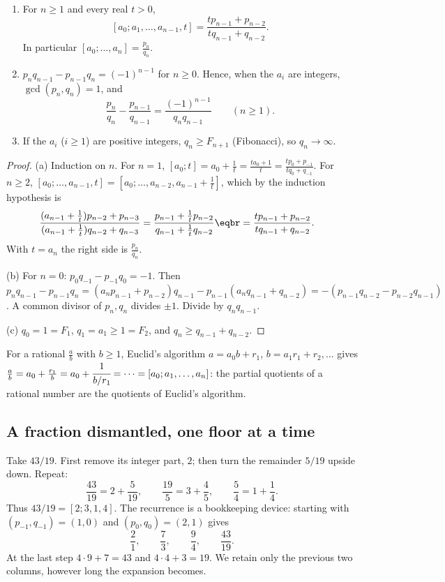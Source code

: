 \begin{proposition}\label{prop:cfconv}
\begin{enumerate}[label=(\alph*)]
\item For $n\ge1$ and every real $t>0$,
\[
[a_0;a_1,\dots,a_{n-1},t]=\frac{tp_{n-1}+p_{n-2}}{tq_{n-1}+q_{n-2}}.
\]
In particular $[a_0;\dots,a_n]=\frac{p_n}{q_n}$.
\item $p_nq_{n-1}-p_{n-1}q_n=(-1)^{n-1}$ for $n\ge0$. Hence, when the $a_i$ are integers, $\gcd(p_n,q_n)=1$, and
\[
\frac{p_n}{q_n}-\frac{p_{n-1}}{q_{n-1}}=\frac{(-1)^{n-1}}{q_nq_{n-1}}\qquad(n\ge1).
\]
\item If the $a_i$ ($i\ge1$) are positive integers, $q_n\ge F_{n+1}$ (Fibonacci), so $q_n\to\infty$.
\end{enumerate}
\end{proposition}
\begin{proof}
(a) Induction on $n$. For $n=1$, $[a_0;t]=a_0+\frac1t=\frac{ta_0+1}{t}=\frac{tp_0+p_{-1}}{tq_0+q_{-1}}$. For $n\ge2$, $[a_0;\dots,a_{n-1},t]=[a_0;\dots,a_{n-2},a_{n-1}+\frac1t]$, which by the induction hypothesis is
\[
\begin{aligned}\frac{(a_{n-1}+\frac1t)p_{n-2}+p_{n-3}}{(a_{n-1}+\frac1t)q_{n-2}+q_{n-3}}&=\frac{p_{n-1}+\frac1tp_{n-2}}{q_{n-1}+\frac1tq_{n-2}}\eqbr=\frac{tp_{n-1}+p_{n-2}}{tq_{n-1}+q_{n-2}}.\end{aligned}
\]
With $t=a_n$ the right side is $\frac{p_n}{q_n}$.

(b) For $n=0$: $p_0q_{-1}-p_{-1}q_0=-1$. Then $p_nq_{n-1}-p_{n-1}q_n=(a_np_{n-1}+p_{n-2})q_{n-1}-p_{n-1}(a_nq_{n-1}+q_{n-2})=-(p_{n-1}q_{n-2}-p_{n-2}q_{n-1})$. A common divisor of $p_n,q_n$ divides $\pm1$. Divide by $q_nq_{n-1}$.

(c) $q_0=1=F_1$, $q_1=a_1\ge1=F_2$, and $q_n\ge q_{n-1}+q_{n-2}$.
\end{proof}

For a rational $\frac ab$ with $b\ge1$, Euclid's algorithm $a=a_0b+r_1$, $b=a_1r_1+r_2,\dots$ gives $\frac ab=a_0+\frac{r_1}b=a_0+\cfrac1{b/r_1}=\cdots=[a_0;a_1,\dots,a_n]$: the partial quotients of a rational number are the quotients of Euclid's algorithm.

\subsection*{A fraction dismantled, one floor at a time}
Take $43/19$. First remove its integer part, $2$; then turn the remainder $5/19$ upside down. Repeat:
\[
\frac{43}{19}=2+\frac5{19},\qquad
\frac{19}5=3+\frac45,\qquad
\frac54=1+\frac14.
\]
Thus $43/19=[2;3,1,4]$. The recurrence is a bookkeeping device: starting with $(p_{-1},q_{-1})=(1,0)$ and $(p_0,q_0)=(2,1)$ gives
\[
\frac21,\qquad\frac73,\qquad\frac94,\qquad\frac{43}{19}.
\]
At the last step $4\cdot9+7=43$ and $4\cdot4+3=19$. We retain only the previous two columns, however long the expansion becomes.

